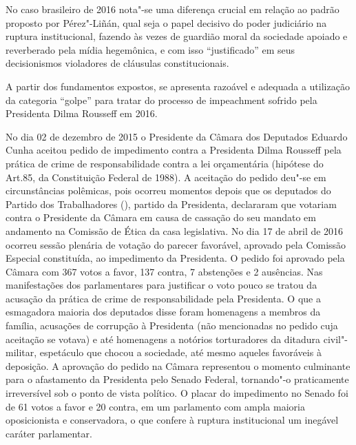 No caso brasileiro de 2016 nota"-se uma diferença crucial em relação ao
padrão proposto por Pérez"-Liñán, qual seja o papel decisivo do poder
judiciário na ruptura institucional, fazendo às vezes de guardião moral
da sociedade apoiado e reverberado pela mídia hegemônica, e com isso
``justificado'' em seus decisionismos violadores de cláusulas
constitucionais.

A partir dos fundamentos expostos, se apresenta razoável e adequada a
utilização da categoria ``golpe'' para tratar do processo de impeachment
sofrido pela Presidenta Dilma Rousseff em 2016.

No dia 02 de dezembro de 2015 o Presidente da Câmara dos Deputados
Eduardo Cunha aceitou pedido de impedimento contra a Presidenta Dilma
Rousseff pela prática de crime de responsabilidade contra a lei
orçamentária (hipótese do Art.85,  da Constituição Federal de 1988). A
aceitação do pedido deu"-se em circunstâncias polêmicas, pois ocorreu
momentos depois que os deputados do Partido dos Trabalhadores (),
partido da Presidenta, declararam que votariam contra o Presidente da
Câmara em causa de cassação do seu mandato em andamento na Comissão de
Ética da casa legislativa. No dia 17 de abril de 2016 ocorreu sessão
plenária de votação do parecer favorável, aprovado pela Comissão
Especial constituída, ao impedimento da Presidenta. O pedido foi
aprovado pela Câmara com 367 votos a favor, 137 contra, 7 abstenções e 2
ausências. Nas manifestações dos parlamentares para justificar o voto
pouco se tratou da acusação da prática de crime de responsabilidade pela
Presidenta. O que a esmagadora maioria dos deputados disse foram
homenagens a membros da família, acusações de corrupção à Presidenta
(não mencionadas no pedido cuja aceitação se votava) e até homenagens a
notórios torturadores da ditadura civil"-militar, espetáculo que chocou a
sociedade, até mesmo aqueles favoráveis à deposição. A
aprovação do pedido na Câmara representou o momento culminante para o
afastamento da Presidenta pelo Senado Federal, tornando"-o praticamente
irreversível sob o ponto de vista político. O placar do impedimento no
Senado foi de 61 votos a favor e 20 contra, em um parlamento com ampla
maioria oposicionista e conservadora, o que confere à ruptura
institucional um inegável caráter parlamentar.

